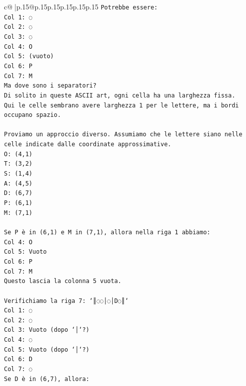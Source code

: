 \documentclass{article}
\begin{document}
{\begin{supertabular}{c@{$\;$}|p{.15\linewidth}@{}p{.15\linewidth}p{.15\linewidth}p{.15\linewidth}p{.15\linewidth}p{.15\linewidth}}
{{{\texttt{Potrebbe essere:} \\
\texttt{Col 1: ◌} \\
\texttt{Col 2: ◌} \\
\texttt{Col 3: ◌} \\
\texttt{Col 4: O} \\
\texttt{Col 5: (vuoto)} \\
\texttt{Col 6: P} \\
\texttt{Col 7: M} \\
\texttt{Ma dove sono i separatori?} \\
\texttt{Di solito in queste ASCII art, ogni cella ha una larghezza fissa.} \\
\texttt{Qui le celle sembrano avere larghezza 1 per le lettere, ma i bordi occupano spazio.} \\
\\ 
\texttt{Proviamo un approccio diverso. Assumiamo che le lettere siano nelle celle indicate dalle coordinate approssimative.} \\
\texttt{O: (4,1)} \\
\texttt{T: (3,2)} \\
\texttt{S: (1,4)} \\
\texttt{A: (4,5)} \\
\texttt{D: (6,7)} \\
\texttt{P: (6,1)} \\
\texttt{M: (7,1)} \\
\\ 
\texttt{Se P è in (6,1) e M in (7,1), allora nella riga 1 abbiamo:} \\
\texttt{Col 4: O} \\
\texttt{Col 5: Vuoto} \\
\texttt{Col 6: P} \\
\texttt{Col 7: M} \\
\texttt{Questo lascia la colonna 5 vuota.} \\
\\ 
\texttt{Verifichiamo la riga 7: `║◌◌│◌│D◌║`} \\
\texttt{Col 1: ◌} \\
\texttt{Col 2: ◌} \\
\texttt{Col 3: Vuoto (dopo `│`?)} \\
\texttt{Col 4: ◌} \\
\texttt{Col 5: Vuoto (dopo `│`?)} \\
\texttt{Col 6: D} \\
\texttt{Col 7: ◌} \\
\texttt{Se D è in (6,7), allora:} \\
}}}
\end{supertabular}}
\end{document}
